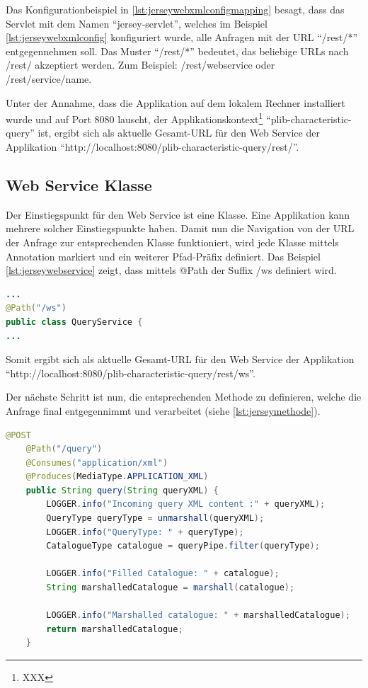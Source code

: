 Das Konfigurationbeispiel in \autoref{lst:jerseywebxmlconfigmapping}  besagt, dass das Servlet mit dem Namen \enquote{jersey-servlet}, welches im Beispiel \autoref{lst:jerseywebxmlconfig}  konfiguriert wurde, alle Anfragen mit der URL \enquote{/rest/*} entgegennehmen soll. Das Muster \enquote{/rest/*} bedeutet, das beliebige URLs nach /rest/ akzeptiert werden. Zum Beispiel: /rest/webservice oder /rest/service/name.

Unter der Annahme, dass die Applikation auf dem lokalem Rechner installiert wurde und auf Port 8080 lauscht, der Applikationskontext\footnote{XXX} \enquote{plib-characteristic-query} ist, ergibt sich als aktuelle Gesamt-URL für den Web Service der Applikation \enquote{http://localhost:8080/plib-characteristic-query/rest/}.
 

\subsection{Web Service Klasse}
Der Einstiegspunkt für den \gls{Web Service} ist eine Klasse. Eine Applikation kann mehrere solcher Einstiegspunkte haben. Damit nun die Navigation von der URL der Anfrage zur entsprechenden Klasse funktioniert, wird jede Klasse mittels Annotation markiert und ein weiterer Pfad-Präfix definiert. Das Beispiel 
\autoref{lst:jerseywebservice} zeigt, dass mittels @Path der Suffix /ws definiert wird. 
  \begin{lstlisting}[caption=Jersey Web Service Klasse, language=Java, label=lst:jerseywebservice]
...
@Path("/ws")
public class QueryService {
...
 \end{lstlisting}  
 
Somit ergibt sich als aktuelle Gesamt-URL für den Web Service der Applikation \\  \enquote{http://localhost:8080/plib-characteristic-query/rest/ws}.
 
Der nächste Schritt ist nun, die entsprechenden Methode zu definieren, welche die Anfrage final entgegennimmt und verarbeitet (siehe \autoref{lst:jerseymethode}). 
 
  \begin{lstlisting}[caption=Jersey Methode, language=Java, label=lst:jerseymethode]
    @POST
    @Path("/query")
    @Consumes("application/xml")
    @Produces(MediaType.APPLICATION_XML)
    public String query(String queryXML) {
        LOGGER.info("Incoming query XML content :" + queryXML);
        QueryType queryType = unmarshall(queryXML);
        LOGGER.info("QueryType: " + queryType);
        CatalogueType catalogue = queryPipe.filter(queryType);

        LOGGER.info("Filled Catalogue: " + catalogue);
        String marshalledCatalogue = marshall(catalogue);

        LOGGER.info("Marshalled catalogue: " + marshalledCatalogue);
        return marshalledCatalogue;
    }
 \end{lstlisting}  

